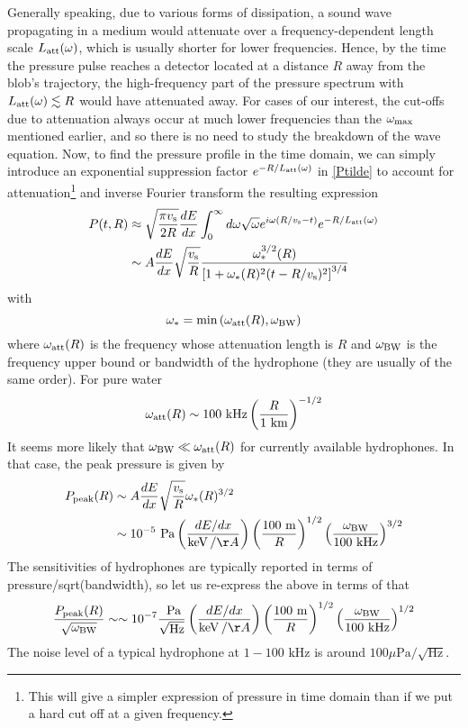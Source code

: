 \documentclass[%
 reprint,
 amsmath,amssymb,
 aps,nofootinbib
]{revtex4-1}
\newcommand{\keV}{\mathinner{\mathrm{keV}}}
\begin{document}
Generally speaking, due to various forms of dissipation, a sound wave propagating in a medium would attenuate over a frequency-dependent length scale $L_{\rm att}(\omega)$, which is usually shorter for lower frequencies. Hence, by the time the pressure pulse reaches a detector located at a distance $R$ away from the blob's trajectory, the high-frequency part of the pressure spectrum with $L_{\rm att}(\omega)\lesssim R$ would have attenuated away. For cases of our interest, the cut-offs due to attenuation always occur at much lower frequencies than the $\omega_{\rm max}$ mentioned earlier, and so there is no need to study the breakdown of the wave equation. Now, to find the pressure profile in the time domain, we can simply introduce an exponential suppression factor $e^{-R/L_{\rm att}(\omega)}$ in \eqref{Ptilde} to account for attenuation\footnote{This will give a simpler expression of pressure in time domain than if we put a hard cut off at a given frequency.} and inverse Fourier transform the resulting expression
\begin{align}
    P(t,R)&\approx \sqrt{\frac{\pi v_{\rm s}}{2R}}\frac{dE}{dx}\int_0^{\infty} d\omega\sqrt{\omega} e^{i\omega (R/v_{\rm s}-t)}e^{-R/L_{\rm att}(\omega)}\nonumber\\
    &\sim A\frac{dE}{dx}\sqrt{\frac{v_{\rm s}}{R}}\frac{\omega_*^{3/2}(R)}{\left[1+\omega_*(R)^2(t-R/v_{\rm s})^2\right]^{3/4}}
\end{align}
with
\begin{equation}
    \omega_*=\text{min}\left(\omega_{\rm att}(R), \omega_{\text{BW}}\right)
\end{equation}
where $\omega_{\rm att}(R)$ is the frequency whose attenuation length is $R$ and $\omega_{\rm BW}$ is the frequency upper bound or bandwidth of the hydrophone (they are usually of the same order). For pure water \cite{Lahmann:2017hsh}
\begin{equation}
    \omega_{\rm att}(R)\sim 100 \text{ kHz} \left(\frac{R}{1\text{ km}}\right)^{-1/2}
\end{equation}
It seems more likely that $\omega_{\rm BW}\ll \omega_{\rm att}(R)$ for currently available hydrophones. In that case, the peak pressure is given by
\begin{align}
    P_{\rm peak}(R)&\sim A\frac{dE}{dx}\sqrt{\frac{v_{\rm s}}{R}}\omega_{*}(R)^{3/2}\nonumber\\
    &\sim 10^{-5}\text{ Pa} \left(\frac{dE/dx}{\keV/\AA}\right)\left(\frac{100\text{ m}}{R}\right)^{1/2}\left(\frac{\omega_{\rm BW}}{100\text{ kHz}}\right)^{3/2}
\end{align}
The sensitivities of hydrophones are typically reported in terms of pressure/sqrt(bandwidth), so let us re-express the above in terms of that
\begin{align}
    \frac{P_{\rm peak}(R)}{\sqrt{\omega_{\rm BW}}}\sim \sim 10^{-7}\frac{\text{ Pa}}{\sqrt{\text{Hz}}} \left(\frac{dE/dx}{\keV/\AA}\right)\left(\frac{100\text{ m}}{R}\right)^{1/2}\left(\frac{\omega_{\rm BW}}{100\text{ kHz}}\right)^{1/2}
\end{align}
The noise level of a typical hydrophone at $1-100\text{ kHz}$ is around $100\mu\text{Pa}/\sqrt{\text{Hz}}$.
\end{document}
